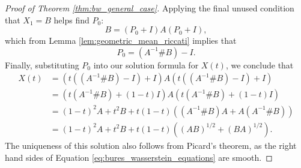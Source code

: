 \documentclass[10pt,a4paper]{amsart}
\begin{document}
\begin{proof}[Proof of Theorem \ref{thm:bw_general_case}]
Applying the final unused condition that $X_1 = B$ helps find $P_0$:
\begin{equation}
    B = (P_0 + I) A (P_0 + I),
\end{equation}
which from Lemma \ref{lem:geometric_mean_riccati} implies that
\begin{equation}
    P_0 = (A^{-1} \# B) - I.
\end{equation}
Finally, substituting $P_0$ into our solution formula for $X(t)$, we conclude that
\begin{align}
    X(t) &= (t((A^{-1} \# B) - I) + I) A (t((A^{-1} \# B) - I) + I) \\
    &= (t(A^{-1} \# B) + (1-t)I) A (t(A^{-1} \# B) + (1-t)I)\\
    &= (1-t)^2 A + t^2 B + t(1-t)((A^{-1}\#B)A + A(A^{-1}\#B))\\
    &= (1-t)^2 A + t^2 B + t(1-t)\left((AB)^{1/2} + (BA)^{1/2}\right).
\end{align}
The uniqueness of this solution also follows from Picard's theorem, as the right hand sides of Equation \ref{eq:bures_wasserstein_equations} are smooth.
\end{proof}
\end{document}
